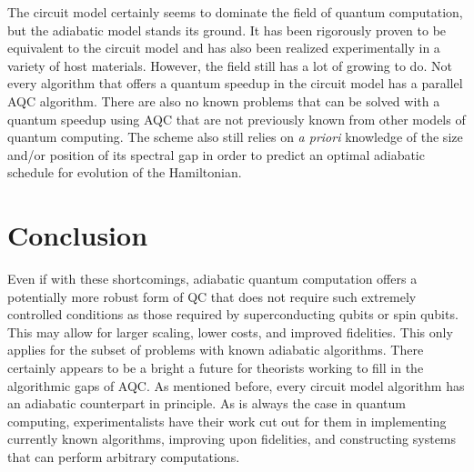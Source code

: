 \documentclass[%
 reprint,
 amsmath,amssymb,
 aps,
]{revtex4-1}
\begin{document}
	The circuit model certainly seems to dominate the field of quantum computation, but the adiabatic model stands its ground. It has been rigorously proven to be equivalent to the circuit model and has also been realized experimentally in a variety of host materials. However, the field still has a lot of growing to do. Not every algorithm that offers a quantum speedup in the circuit model has a parallel AQC algorithm. There are also no known problems that can be solved with a quantum speedup using AQC that are not previously known from other models of quantum computing. The scheme also still relies on \textit{a priori} knowledge of the size and/or position of its spectral gap in order to predict an optimal adiabatic schedule for evolution of the Hamiltonian.
	
	\section{Conclusion}
	Even if with these shortcomings, adiabatic quantum computation offers a potentially more robust form of QC that does not require such extremely controlled conditions as those required by superconducting qubits or spin qubits. This may allow for larger scaling, lower costs, and improved fidelities. This only applies for the subset of problems with known adiabatic algorithms. There certainly appears to be a bright a future for theorists working to fill in the algorithmic gaps of AQC. As mentioned before, every circuit model algorithm has an adiabatic counterpart in principle. As is always the case in quantum computing, experimentalists have their work cut out for them in implementing currently known algorithms, improving upon fidelities, and constructing systems that can perform arbitrary computations.
\end{document}
